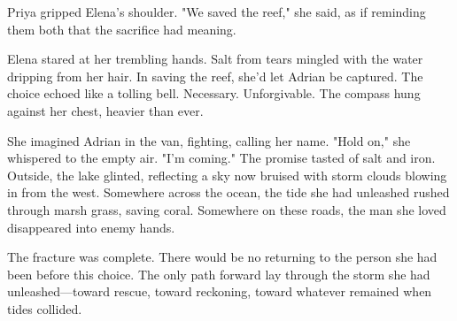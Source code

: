Priya gripped Elena's shoulder. "We saved the reef," she said, as if reminding them both that the sacrifice had meaning.

Elena stared at her trembling hands. Salt from tears mingled with the water dripping from her hair. In saving the reef, she'd let Adrian be captured. The choice echoed like a tolling bell. Necessary. Unforgivable. The compass hung against her chest, heavier than ever.

She imagined Adrian in the van, fighting, calling her name. "Hold on," she whispered to the empty air. "I'm coming." The promise tasted of salt and iron. Outside, the lake glinted, reflecting a sky now bruised with storm clouds blowing in from the west. Somewhere across the ocean, the tide she had unleashed rushed through marsh grass, saving coral. Somewhere on these roads, the man she loved disappeared into enemy hands.

The fracture was complete. There would be no returning to the person she had been before this choice. The only path forward lay through the storm she had unleashed—toward rescue, toward reckoning, toward whatever remained when tides collided.

